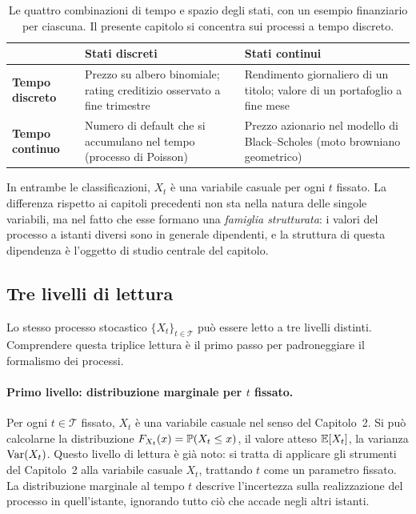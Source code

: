 \begin{table}[ht]
\centering
\begin{tabular}{|p{3.0cm}|p{5.0cm}|p{5.0cm}|}
\hline
 & \textbf{Stati discreti} & \textbf{Stati continui}\\
\hline
\textbf{Tempo discreto} &
Prezzo su albero binomiale; rating creditizio osservato a fine
trimestre &
Rendimento giornaliero di un titolo; valore di un portafoglio a fine
mese\\
\hline
\textbf{Tempo continuo} &
Numero di default che si accumulano nel tempo (processo di Poisson) &
Prezzo azionario nel modello di Black--Scholes (moto browniano
geometrico)\\
\hline
\end{tabular}
\caption{Le quattro combinazioni di tempo e spazio degli stati, con
un esempio finanziario per ciascuna. Il presente capitolo si concentra sui
processi a tempo discreto.}
\label{tab:classi-processi}
\end{table}

In entrambe le classificazioni, $X_t$ \`{e} una variabile casuale per
ogni $t$ fissato. La differenza rispetto ai capitoli precedenti non
sta nella natura delle singole variabili, ma nel fatto che esse
formano una \emph{famiglia strutturata}: i valori del processo a
istanti diversi sono in generale dipendenti, e la struttura di questa
dipendenza \`{e} l'oggetto di studio centrale del capitolo.

\subsection{Tre livelli di lettura}

Lo stesso processo stocastico $\{X_t\}_{t\in\mathcal{T}}$ pu\`{o}
essere letto a tre livelli distinti. Comprendere questa triplice
lettura \`{e} il primo passo per padroneggiare il formalismo dei
processi.

\paragraph{Primo livello: distribuzione marginale per $t$ fissato.}
Per ogni $t\in\mathcal{T}$ fissato, $X_t$ \`{e} una variabile casuale
nel senso del Capitolo~2. Si pu\`{o} calcolarne la distribuzione
$F_{X_t}(x)=\mathbb{P}(X_t\leq x)$, il valore atteso $\mathbb{E}[X_t]$, la varianza
$\operatorname{Var}(X_t)$. Questo livello di lettura \`{e} gi\`{a} noto: si tratta
di applicare gli strumenti del Capitolo~2 alla variabile casuale
$X_t$, trattando $t$ come un parametro fissato. La distribuzione
marginale al tempo $t$ descrive l'incertezza sulla realizzazione del
processo in quell'istante, ignorando tutto ci\`{o} che accade negli
altri istanti.

